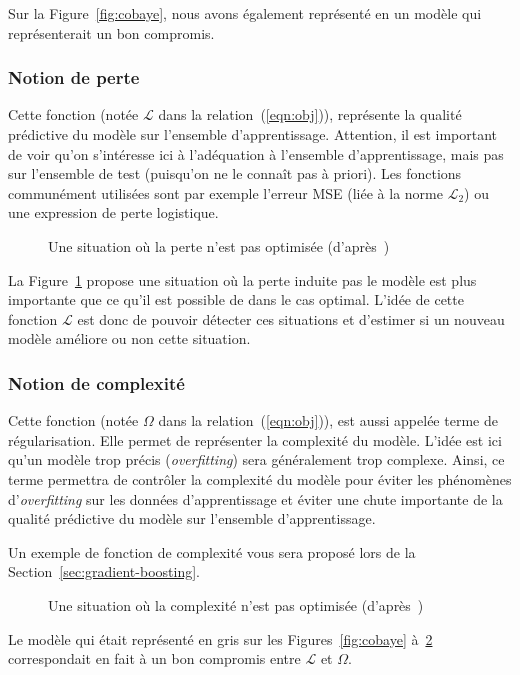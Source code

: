 Sur la Figure~\ref{fig:cobaye}, nous avons également représenté en  un modèle qui représenterait un bon compromis.

\subsubsection{Notion de perte}

Cette fonction (notée $\mathcal{L}$ dans la relation~(\ref{eqn:obj})), représente la qualité prédictive du modèle sur l'ensemble d'apprentissage. Attention, il est important de voir qu'on s'intéresse ici à l'adéquation à l'ensemble d'apprentissage, mais pas sur l'ensemble de test (puisqu'on ne le connaît pas à priori). Les fonctions communément utilisées sont par exemple l'erreur MSE (liée à la norme $\mathcal{L}_2$) ou une expression de perte logistique.

\begin{figure}[h]
	\begin{margincap}
	  \centering
	  
	  \caption{Une situation où la perte n'est pas optimisée (d'après~\cite{bib:xgboost-main})}
	  \label{fig:loss}
	\end{margincap}
\end{figure}

La Figure~\ref{fig:loss} propose une situation où la perte induite pas le modèle est plus importante que ce qu'il est possible de dans le cas optimal. L'idée de cette fonction $\mathcal{L}$ est donc de pouvoir détecter ces situations et d'estimer si un nouveau modèle améliore ou non cette situation.

\subsubsection{Notion de complexité}

Cette fonction (notée $\Omega$ dans la relation~(\ref{eqn:obj})), est aussi appelée terme de régularisation. Elle permet de représenter la complexité du modèle. L'idée est ici qu'un modèle trop précis (\textit{overfitting}) sera généralement trop complexe. Ainsi, ce terme permettra de contrôler la complexité du modèle pour éviter les phénomènes d'\textit{overfitting} sur les données d'apprentissage et éviter une chute importante de la qualité prédictive du modèle sur l'ensemble d'apprentissage.

Un exemple de fonction de complexité vous sera proposé lors de la Section~\ref{sec:gradient-boosting}.

\begin{figure}[h]
	\begin{margincap}
	  \centering
	  
	  \caption{Une situation où la complexité n'est pas optimisée (d'après~\cite{bib:xgboost-main})}
	  \label{fig:complexity}
	\end{margincap}
\end{figure}

Le modèle qui était représenté en gris sur les Figures~\ref{fig:cobaye} à~\ref{fig:complexity} correspondait en fait à un bon compromis entre $\mathcal{L}$ et $\Omega$.

